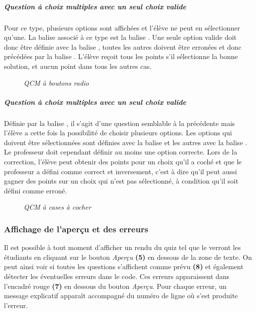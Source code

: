 \documentclass[a4paper,11pt,openany,oneside]{sphinxmanual}
\begin{document}
\subparagraph{Question à choix multiples avec un seul choix valide}
\label{doc-user:question-a-choix-multiples-avec-un-seul-choix-valide}
Pour ce type, plusieurs options sont affichées et l'élève ne peut en sélectionner qu'une. La balise associé à ce type est la balise \code{**}. Une seule option valide doit donc être définie avec la balise \code{=}, toutes les autres doivent être erronées et donc précédées par la balise \code{*}. L'élève reçoit tous les points s'il sélectionne la bonne solution, et aucun point dans tous les autres cas.
\begin{figure}[htbp]
\centering
\capstart

\caption{\emph{QCM à boutons radio}}\end{figure}


\subparagraph{Question à choix multiples avec un seul choix valide}
\label{doc-user:id1}
Définie par la balise \code{\#\#}, il s'agit d'une question semblable à la précédente mais l'élève a cette fois la possibilité de choisir plusieurs options. Les options qui doivent être sélectionnées sont définies avec la balise \code{=} et les autres avec la balise \code{*}. Le professeur doit cependant définir au moins une option correcte. Lors de la correction, l'élève peut obtenir des points pour un choix qu'il a coché et que le professeur a défini comme correct et inversement, c'est à dire qu'il peut aussi gagner des points sur un choix qui n'est pas sélectionné, à condition qu'il soit défini comme erroné.
\begin{figure}[htbp]
\centering
\capstart

\caption{\emph{QCM à cases à cocher}}\end{figure}


\subsubsection{Affichage de l'aperçu et des erreurs}
\label{doc-user:affichage-de-l-apercu-et-des-erreurs}
Il est possible à tout moment d'afficher un rendu du quiz tel que le verront les étudiants en cliquant sur le bouton \emph{Aperçu} \textbf{(5)} en dessous de la zone de texte. On peut ainsi voir si toutes les questions s'affichent comme prévu \textbf{(8)} et également détecter les éventuelles erreurs dans le code. Ces erreurs apparaissent dans l'encadré rouge \textbf{(7)} en dessous du bouton \emph{Aperçu}. Pour chaque erreur, un message explicatif apparaît accompagné du numéro de ligne où s'est produite l'erreur.
\end{document}
